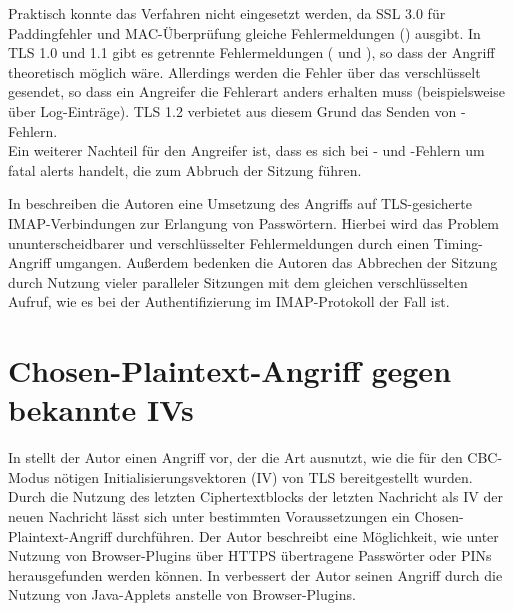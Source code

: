 Praktisch konnte das Verfahren nicht eingesetzt werden, da SSL 3.0 für Paddingfehler und MAC-Überprüfung gleiche Fehlermeldungen (\badrecordmac{}) ausgibt. In TLS 1.0 und 1.1 gibt es getrennte Fehlermeldungen (\badrecordmac{} und \decryptionfailed{}), so dass der Angriff theoretisch möglich wäre. Allerdings werden die Fehler über das \alertprotocol{} verschlüsselt gesendet, so dass ein Angreifer die Fehlerart anders erhalten muss (beispielsweise über Log-Einträge). TLS 1.2 verbietet aus diesem Grund das Senden von \decryptionfailed{}-Fehlern.\\
Ein weiterer Nachteil für den Angreifer ist, dass es sich bei \badrecordmac{}- und \decryptionfailed{}-Fehlern um fatal alerts handelt, die zum Abbruch der Sitzung führen.

In \cite{canvel03} beschreiben die Autoren eine Umsetzung des Angriffs auf TLS-gesicherte IMAP-Verbindungen zur Erlangung von Passwörtern. Hierbei wird das Problem ununterscheidbarer und verschlüsselter Fehlermeldungen durch einen Timing-Angriff umgangen. Außerdem bedenken die Autoren das Abbrechen der Sitzung durch Nutzung vieler paralleler Sitzungen mit dem gleichen verschlüsselten Aufruf, wie es bei der Authentifizierung im IMAP-Protokoll der Fall ist.



%

\section{Chosen-Plaintext-Angriff gegen bekannte IVs}
\label{sec_known_ivs}

In \cite{bard04} stellt der Autor einen Angriff vor, der die Art ausnutzt, wie die für den CBC-Modus nötigen Initialisierungsvektoren (IV) von TLS bereitgestellt wurden. Durch die Nutzung des letzten Ciphertextblocks der letzten Nachricht als IV der neuen Nachricht lässt sich unter bestimmten Voraussetzungen ein Chosen-Plaintext-Angriff durchführen. Der Autor beschreibt eine Möglichkeit, wie unter Nutzung von Browser-Plugins über HTTPS übertragene Passwörter oder PINs herausgefunden werden können. In \cite{bard06} verbessert der Autor seinen Angriff durch die Nutzung von Java-Applets anstelle von Browser-Plugins.

